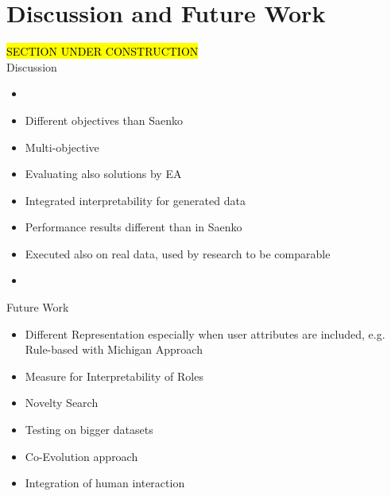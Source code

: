 \newpage
\section{Discussion and Future Work}
\hl{SECTION UNDER CONSTRUCTION}\\
\iffalse
\hl{State what you've done and what you've found
Summarize contributions (achievements and impact)
Outline open issues/directions for future work
\\\\
The final chapter of the Master's thesis is the Conclusions chapter. Here is where the writer sums up the entire project in one to two brief paragraphs. This chapter should remind the reader of the initial problem statement or hypothesis and then relate that to the results from the study. The writer should then present any conclusions reached or any new insights that arose from this work.  Finally, the writer should present the research in terms of the overall impact in the field. For example, how will the results of this study change the way a person or organization behaves or makes decisions? One caution when writing this chapter is not to merely reiterate the other portions of the thesis. Instead, the writer should strive to leave a lasting impression upon the reader, conveying with the same passion that drove the research project the importance of the work completed.
\\\\
Summary of the problem, the main findings and the discussion. Structured according to the issues in chapter 2.
Comparison with the literature presented in chapter 2: how do your results fill in, advance or contradict previously reported research?
What are the implications of your research for people working in the field that you have studies? In which direction should further research go? }
\fi

Discussion
\begin{itemize}
\item 
\item Different objectives than Saenko
\item Multi-objective
\item Evaluating also solutions by EA
\item Integrated interpretability for generated data
\item Performance results different than in Saenko
\item Executed also on real data, used by research to be comparable
\item
\end{itemize}
Future Work
\begin{itemize}
\item Different Representation especially when user attributes are included, e.g. Rule-based with Michigan Approach
\item Measure for Interpretability of Roles
\item Novelty Search
\item Testing on bigger datasets
\item Co-Evolution approach
\item Integration of human interaction
\end{itemize}
